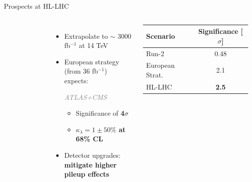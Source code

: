 \begin{frame}{Prospects at HL-LHC}

\begin{columns}

\begin{figure}
  \centering
\end{figure}


\begin{itemize}
    \item Extrapolate to $\sim$ 3000 fb$^{-1}$ at 14 TeV
    \item European strategy (from 36 fb$^{-1}$) expects: 
    \begin{center}
       \textit{ \textcolor{gray}{ATLAS+CMS}}
    \end{center}
    \begin{itemize}
        \item Significance of \textbf{\textcolor{HHred}{4$\sigma$}}
        \item \textbf{$\kappa_{\lambda} = 1 \pm 50\%$ at 68\% CL}
    \end{itemize}
    \item Detector upgrades: \textbf{mitigate higher pileup effects} 
\end{itemize}

\begin{table}[]
    \centering
    \begin{tabular}{lc}
        \hline\hline
        Scenario & Significance [$\sigma$]  \\
        \hline
        Run-2 & 0.48 \\
        European Strat. & 2.1 \\
        HL-LHC & \textcolor{HHturquoise_d}{\textbf{2.5}} \\
        \hline\hline
    \end{tabular}
\end{table}
\end{columns}  
\end{frame}